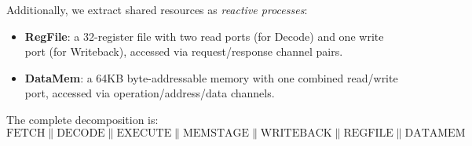 \documentclass[11pt]{article}
\begin{document}
Additionally, we extract shared resources as \emph{reactive processes}:

\begin{itemize}
\item \textbf{RegFile}: a 32-register file with two read ports (for Decode)
  and one write port (for Writeback), accessed via request/response channel
  pairs.

\item \textbf{DataMem}: a 64KB byte-addressable memory with one combined
  read/write port, accessed via operation/address/data channels.
\end{itemize}

The complete decomposition is:
\[
\text{FETCH} \parallel \text{DECODE} \parallel \text{EXECUTE}
\parallel \text{MEMSTAGE} \parallel \text{WRITEBACK}
\parallel \text{REGFILE} \parallel \text{DATAMEM}
\]
\end{document}
